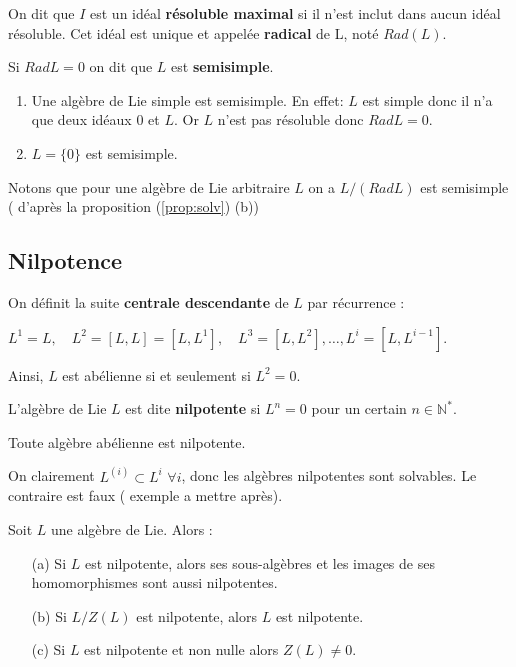 \documentclass[a4paper,openany,12pt]{report}
\newcommand{\NN}{\mathbb{N}}
\theoremstyle{break}
{\theorembodyfont{\upshape}
\newtheorem*{rmq}{Remarque :}
\newtheorem*{prv}{Preuve :}
\newtheorem*{ex}{Exemples :}
\newtheorem*{exe}{Exemple : }
\newtheorem*{nota}{Notation :}
\newtheorem*{dem}{D\'emonstration :}}
\begin{document}
\begin{df}
\quad On dit que $I$ est un idéal \textbf{résoluble maximal} si il n'est inclut dans aucun idéal résoluble. Cet idéal est unique et appelée \textbf{radical} de L, noté $Rad(L)$.
\end{df}

\begin{df}
\quad Si $Rad L=0$ on dit que $L$ est \textbf{semisimple}.
\end{df}

\begin{ex}
\begin{enumerate}
\item Une algèbre de Lie simple est semisimple.
En effet: $L$ est simple donc il n'a que deux idéaux ${0}$ et $L$. Or $L$ n'est pas résoluble donc $Rad L= {0}$.

\item $L= \{0\}$ est semisimple.
\end{enumerate}
\end{ex}

Notons que pour une algèbre de Lie arbitraire $L$ on a $L/(Rad L)$ est semisimple ( d'après la proposition (\ref{prop:solv}) (b))

\subsection{Nilpotence}

On définit la suite \textbf{centrale descendante} de $L$ par récurrence :
\begin{center}
$L^{1}=L, \quad L^{2}=[L, L]=\left[L, L^{1}\right], \quad L^{3}=\left[L, L^{2}\right], \ldots, L^{i}=\left[L, L^{i-1}\right]$.
\end{center}
Ainsi, $L$ est abélienne si et seulement si $L^{2}=0$.

\begin{df}
L'algèbre de Lie $L$ est dite \textbf{nilpotente} si $L^{n}=0$ pour un certain $n \in \NN^{*}$.
\end{df}

\begin{exe}
Toute algèbre abélienne est nilpotente.

On clairement $L^{(i)}\subset L^{i}$ $\forall i$, donc les algèbres nilpotentes sont solvables.
Le contraire est faux ( exemple a mettre après).
\end{exe}

\begin{prop}\label{prop:nilp}
\quad Soit $L$ une algèbre de Lie. Alors :
\begin{itemize}
\item[(a)] Si $L$ est nilpotente, alors ses sous-algèbres et les images de ses homomorphismes sont aussi nilpotentes.

\item[(b)]  Si $L/Z(L)$ est nilpotente, alors $L$ est nilpotente.

\item[(c)] Si $L$ est nilpotente et non nulle alors $Z(L) \ne 0$.
\end{itemize}
\end{prop}
\end{document}
